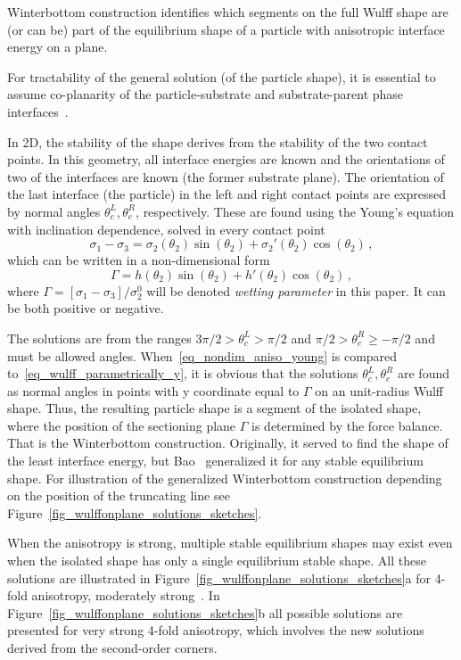 Winterbottom construction identifies which segments on the full Wulff shape are (or can be) part of the equilibrium shape of a particle with anisotropic interface energy on a plane. 

For tractability of the general solution (of the particle shape), it is essential to assume co-planarity of the particle-substrate and substrate-parent phase interfaces~\cite{Winterbottom1967, Cahn1974, Bao2017}. 

In 2D, the stability of the shape derives from the stability of the two contact points. In this geometry, all interface energies are known and the orientations of two of the interfaces are known (the former substrate plane). The orientation of the last interface (the particle) in the left and right contact points are expressed by normal angles $\theta_c^L,\theta_c^R$, respectively. These are found using the Young's equation with inclination dependence, solved in every contact point 
\begin{equation}\label{eq_Young_anisotropic}
	\sigma_1 - \sigma_{3} = \sigma_2(\theta_2)\sin(\theta_2) + \sigma_2'(\theta_2)\cos(\theta_2) \,,
\end{equation}
which can be written in a non-dimensional form
\begin{equation} \label{eq_nondim_aniso_young}
	\Gamma = h(\theta_2)\sin(\theta_2) + h'(\theta_2)\cos(\theta_2) \,,
\end{equation}
where $\Gamma = [\sigma_{1}-\sigma_3 ]/\sigma_2^0$ will be denoted \textit{wetting parameter} in this paper. It can be both positive or negative. 

The solutions are from the ranges $3\pi/2>\theta_c^L>\pi/2$ and $\pi/2>\theta_c^R\geq-\pi/2$ and must be allowed angles. When~\eqref{eq_nondim_aniso_young} is compared to~\eqref{eq_wulff_parametrically_y}, it is obvious that the solutions $\theta_c^L,\theta_c^R$ are found as normal angles in points with y coordinate equal to $\Gamma$ on an unit-radius Wulff shape.  Thus, the resulting particle shape is a segment of the isolated shape, where the position of the sectioning plane $\Gamma$ is determined by the force balance. That is the Winterbottom construction. Originally, it served to find the shape of the least interface energy, but Bao~\cite{Bao2017} generalized it for any stable equilibrium shape. For illustration of the generalized Winterbottom construction depending on the position of the truncating line see Figure~\ref{fig_wulffonplane_solutions_sketches}.

When the anisotropy is strong, multiple stable equilibrium shapes may exist even when the isolated shape has only a single equilibrium stable shape. All these solutions are illustrated in Figure~\ref{fig_wulffonplane_solutions_sketches}a for 4-fold anisotropy, moderately strong~\cite{Bao2017}. In  Figure~\ref{fig_wulffonplane_solutions_sketches}b all possible solutions are presented for very strong 4-fold anisotropy, which involves the new solutions derived from the second-order corners.

